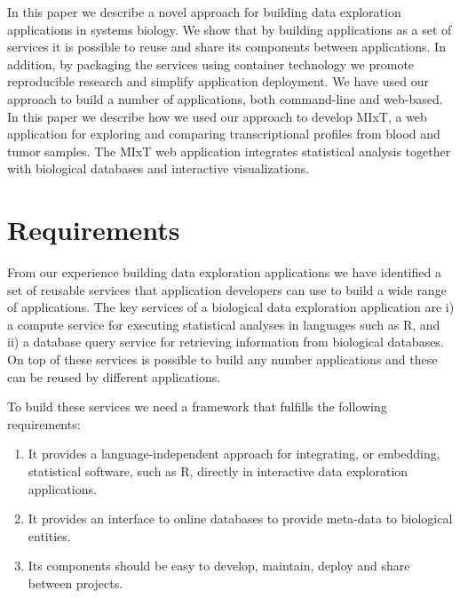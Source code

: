 

In this paper we describe a novel approach for building data exploration
applications in systems biology. We show that by building applications as a set
of services it is possible to reuse and share its components between
applications. In addition, by packaging the services using container technology
we promote reproducible research and simplify application deployment. We have
used our approach to build a number of applications, both command-line and
web-based. In this paper we describe how we used our approach to develop MIxT,
a web application for exploring and comparing transcriptional profiles from
blood and tumor samples. The MIxT web application integrates statistical
analysis together with biological databases and interactive visualizations.


\section*{Requirements} 
From our experience building data exploration applications we have identified a
set of reusable services that application developers can use to build a wide
range of applications. The key services of a biological data exploration
application are i) a compute service for executing statistical analyses in
languages such as R, and ii) a database query service for retrieving information
from biological databases.
On top of these services is possible to build any number applications and these
can be reused by different applications. 

To build these services we need a framework that fulfills the following
requirements: 

\begin{enumerate}
    \item It provides a language-independent approach for integrating, or
        embedding, statistical software, such as R, directly in interactive data
        exploration applications.
    \item It provides an interface to online databases to provide meta-data to
        biological entities. %
    \item Its components should be easy to develop, maintain, deploy and share
        between projects. 
\end{enumerate} 


